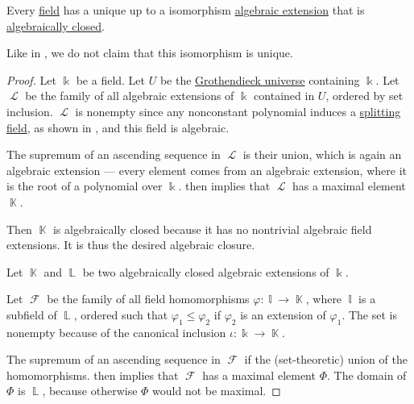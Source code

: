 \begin{proposition}\label{thm:algebraic_closure_existence}
  Every \hyperref[def:field]{field} has a unique up to a isomorphism \hyperref[def:algebraic_extension]{algebraic extension} that is \hyperref[def:algebraically_closed_field]{algebraically closed}.
\end{proposition}
\begin{comments}
  \item Like in , we do not claim that this isomorphism is unique.
\end{comments}
\begin{proof}
  \ExistenceSubProof{} Let \( \Bbbk \) be a field. Let \( U \) be the \hyperref[def:grothendieck_universe]{Grothendieck universe} containing \( \Bbbk \). Let \( \mscrL \) be the family of all algebraic extensions of \( \Bbbk \) contained in \( U \), ordered by set inclusion. \( \mscrL \) is nonempty since any nonconstant polynomial induces a \hyperref[def:splitting_field]{splitting field}, as shown in , and this field is algebraic.

  The supremum of an ascending sequence in \( \mscrL \) is their union, which is again an algebraic extension --- every element comes from an algebraic extension, where it is the root of a polynomial over \( \Bbbk \).  then implies that \( \mscrL \) has a maximal element \( \BbbK \).

  Then \( \BbbK \) is algebraically closed because it has no nontrivial algebraic field extensions. It is thus the desired algebraic closure.

  \UniquenessSubProof Let \( \BbbK \) and \( \BbbL \) be two algebraically closed algebraic extensions of \( \Bbbk \).

  Let \( \mscrF \) be the family of all field homomorphisms \( \varphi: \Bbbl \to \BbbK \), where \( \Bbbl \) is a subfield of \( \BbbL \), ordered such that \( \varphi_1 \leq \varphi_2 \) if \( \varphi_2 \) is an extension of \( \varphi_1 \). The set is nonempty because of the canonical inclusion \( \iota: \Bbbk \to \BbbK \).

  The supremum of an ascending sequence in \( \mscrF \) if the (set-theoretic) union of the homomorphisms.  then implies that \( \mscrF \) has a maximal element \( \Phi \). The domain of \( \Phi \) is \( \BbbL \), because otherwise \( \Phi \) would not be maximal.


\end{proof}
